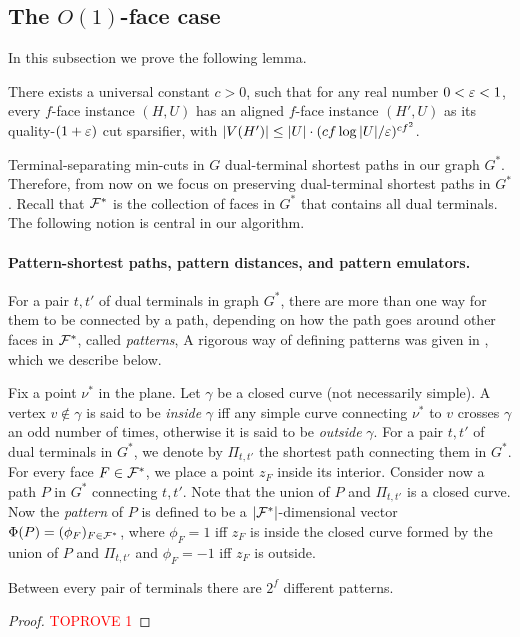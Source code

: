 \subsection{The $O(1)$-face case}

In this subsection we prove the following lemma.

\begin{lemma}
	\label{lem: O(1) face}
	There exists a universal constant $c>0$, such that for any real number $0<{\varepsilon}<1$, every $f$-face instance $(H,U)$ has an aligned $f$-face instance $(H',U)$ as its quality-$(1+{\varepsilon})$ cut sparsifier, with $|V(H')|\le |U|\cdot (cf\log |U|/{\varepsilon})^{cf^2}$.
\end{lemma}

Terminal-separating min-cuts in $G$ dual-terminal shortest paths in our graph $G^*$. Therefore, from now on we focus on preserving dual-terminal shortest paths in $G^*$. Recall that ${\mathcal{F}}^*$ is the collection of faces in $G^*$ that contains all dual terminals. The following notion is central in our algorithm.


\paragraph{Pattern-shortest paths, pattern distances, and pattern emulators.}
For a pair $t,t'$ of dual terminals in graph $G^*$, there are more than one way for them to be connected by a path, depending on how the path goes around other faces in ${\mathcal{F}}^*$, called \emph{patterns},  A rigorous way of defining patterns was given in \cite{krauthgamer2017refined}, which we describe below.

Fix a point $\nu^*$ in the plane.
Let $\gamma$ be a closed curve (not necessarily simple). A vertex $v\notin \gamma$ is said to be \emph{inside} $\gamma$ iff any simple curve connecting $\nu^*$ to $v$ crosses $\gamma$ an odd number of times, otherwise it is said to be \emph{outside} $\gamma$.
%
For a pair $t,t'$ of dual terminals in $G^*$, we denote by $\Pi_{t,t'}$ the shortest path connecting them in $G^*$.
For every face $F\in {\mathcal{F}}^*$, we place a point $z_F$ inside its interior. Consider now a path $P$ in $G^*$ connecting $t,t'$. Note that the union of $P$ and $\Pi_{t,t'}$ is a closed curve. Now the \emph{pattern} of $P$ is defined to be a $|{\mathcal{F}}^*|$-dimensional vector $\Phi(P)=(\phi_F)_{F\in {\mathcal{F}}^*}$, where $\phi_F=1$ iff $z_F$ is inside the closed curve formed by the union of $P$ and $\Pi_{t,t'}$ and $\phi_F=-1$ iff $z_F$ is outside.

\begin{observation}
\label{obs: pattern}
Between every pair of terminals there are $2^{f}$ different patterns.
\end{observation}
\begin{proof}\textcolor{red}{TOPROVE 1}\end{proof}

